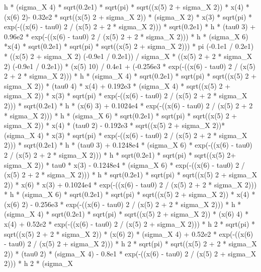 \begin{maplegroup}
h * (sigma\_X  4) * sqrt(0.2e1) * sqrt(pi) * sqrt((x(5)  2 + sigma\_X  2)) * x(4) * (x(6)  2)- 0.32e2 * sqrt((x(5)  2 + sigma\_X  2)) * (sigma\_X  2) * x(3) * sqrt(pi) * exp(-((x(6) - tau0)  2 / (x(5)  2 + 2 * sigma\_X  2))) * sqrt(0.2e1) * h * (tau0  3) + 0.96e2 * exp(-((x(6) - tau0)  2 / (x(5)  2 + 2 * sigma\_X  2))) * h * (sigma\_X  6) *x(4) * sqrt(0.2e1) * sqrt(pi) * sqrt((x(5)  2 + sigma\_X  2))) * pi  (-0.1e1 / 0.2e1) * ((x(5)  2 + sigma\_X  2)  (-0.9e1 / 0.2e1)) / sigma\_X * ((x(5)  2 + 2 * sigma\_X  2)  (-0.9e1 / 0.2e1)) * (x(5)  10) / 0.4e1 + (-0.256e3 * exp(-((x(6) - tau0) 2 / (x(5)  2 + 2 * sigma\_X  2))) * h * (sigma\_X  4) * sqrt(0.2e1) * sqrt(pi) * sqrt((x(5)  2 + sigma\_X  2)) * (tau0  4) * x(4) + 0.192e3 * (sigma\_X  4) * sqrt((x(5)  2 + sigma\_X  2)) * x(3) * sqrt(pi) * exp(-((x(6) - tau0)  2 / (x(5)  2 + 2 * sigma\_X  2))) * sqrt(0.2e1) * h * (x(6)  3) + 0.1024e4 * exp(-((x(6) - tau0)  2 / (x(5)  2 + 2 * sigma\_X  2))) * h * (sigma\_X  6) * sqrt(0.2e1) * sqrt(pi) * sqrt((x(5)  2 + sigma\_X  2)) * x(4) * (tau0  2) - 0.192e3 * sqrt((x(5)  2 + sigma\_X  2))* (sigma\_X  4) * x(3) * sqrt(pi) * exp(-((x(6) - tau0)  2 / (x(5)  2 + 2 * sigma\_X  2))) * sqrt(0.2e1) * h * (tau0  3) + 0.1248e4 * (sigma\_X  6) * exp(-((x(6) - tau0)  2 / (x(5)  2 + 2 * sigma\_X  2))) * h * sqrt(0.2e1) * sqrt(pi) * sqrt((x(5)  2+ sigma\_X  2)) * tau0 * x(3) - 0.1248e4 * (sigma\_X  6) * exp(-((x(6) - tau0)  2 / (x(5)  2 + 2 * sigma\_X  2))) * h * sqrt(0.2e1) * sqrt(pi) * sqrt((x(5)  2 + sigma\_X  2)) * x(6) * x(3) + 0.1024e4 * exp(-((x(6) - tau0)  2 / (x(5)  2 + 2 * sigma\_X 2))) * h * (sigma\_X  6) * sqrt(0.2e1) * sqrt(pi) * sqrt((x(5)  2 + sigma\_X  2)) * x(4) * (x(6)  2) - 0.256e3 * exp(-((x(6) - tau0)  2 / (x(5)  2 + 2 * sigma\_X  2))) * h * (sigma\_X  4) * sqrt(0.2e1) * sqrt(pi) * sqrt((x(5)  2 + sigma\_X  2)) * (x(6)  4) * x(4) + 0.52e2 * exp(-((x(6) - tau0)  2 / (x(5)  2 + sigma\_X  2))) * h  2 * sqrt(pi) * sqrt((x(5)  2 + 2 * sigma\_X  2)) * (x(6)  2) * (sigma\_X  4) + 0.52e2 * exp(-((x(6) - tau0)  2 / (x(5)  2 + sigma\_X  2))) * h  2 * sqrt(pi) * sqrt((x(5)  2 + 2 * sigma\_X  2)) * (tau0  2) * (sigma\_X  4) - 0.8e1 * exp(-((x(6) - tau0)  2 / (x(5)  2 + sigma\_X  2))) * h  2 * (sigma\_X 
\end{maplegroup}
